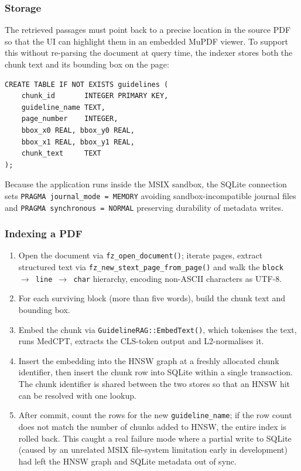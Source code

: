 \subsubsection{Storage}
The retrieved passages must point back to a precise location in the source PDF so that the UI can highlight them in an embedded MuPDF viewer. To support this without re-parsing the document at query time, the indexer stores both the chunk text and its bounding box on the page:

\begin{verbatim}
CREATE TABLE IF NOT EXISTS guidelines (
    chunk_id       INTEGER PRIMARY KEY,
    guideline_name TEXT,
    page_number    INTEGER,
    bbox_x0 REAL, bbox_y0 REAL,
    bbox_x1 REAL, bbox_y1 REAL,
    chunk_text     TEXT
);
\end{verbatim}

Because the application runs inside the MSIX sandbox, the SQLite connection sets \texttt{PRAGMA journal\_mode = MEMORY} avoiding sandbox-incompatible journal files and \texttt{PRAGMA synchronous = NORMAL} preserving durability of metadata writes.

\subsubsection{Indexing a PDF}
\begin{enumerate}
    \item Open the document via \texttt{fz\_open\_document()}; iterate pages, extract structured text via \texttt{fz\_new\_stext\_page\_from\_page()} and walk the \texttt{block $\rightarrow$ line $\rightarrow$ char} hierarchy, encoding non-ASCII characters as UTF-8.
    \item For each surviving block (more than five words), build the chunk text and bounding box.
    \item Embed the chunk via \texttt{GuidelineRAG::EmbedText()}, which tokenises the text, runs MedCPT, extracts the CLS-token output and L2-normalises it.
    \item Insert the embedding into the HNSW graph at a freshly allocated chunk identifier, then insert the chunk row into SQLite within a single transaction. The chunk identifier is shared between the two stores so that an HNSW hit can be resolved with one lookup.
    \item After commit, count the rows for the new \texttt{guideline\_name}; if the row count does not match the number of chunks added to HNSW, the entire index is rolled back. This caught a real failure mode where a partial write to SQLite (caused by an unrelated MSIX file-system limitation early in development) had left the HNSW graph and SQLite metadata out of sync.
\end{enumerate} 

